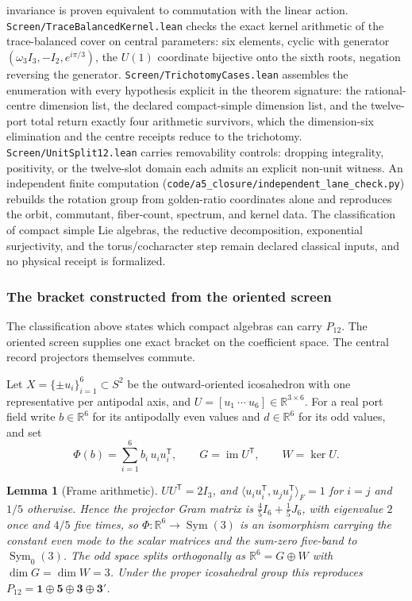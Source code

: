 \documentclass[11pt]{article}
\newtheorem{lemma}[theorem]{Lemma}
\begin{document}
invariance is proven equivalent to commutation with the linear action.
\texttt{Screen/\allowbreak TraceBalancedKernel.lean} checks the exact kernel
arithmetic of the trace-balanced cover on central parameters: six elements,
cyclic with generator \((\omega_3I_3,-I_2,e^{i\pi/3})\), the \(U(1)\)
coordinate bijective onto the sixth roots, negation reversing the generator.
\texttt{Screen/\allowbreak TrichotomyCases.lean} assembles the enumeration
with every hypothesis explicit in the theorem signature: the rational-centre
dimension list, the declared compact-simple dimension list, and the
twelve-port total return exactly four arithmetic survivors, which the
dimension-six elimination and the centre receipts reduce to the trichotomy.
\texttt{Screen/\allowbreak UnitSplit12.lean} carries removability controls:
dropping integrality, positivity, or the twelve-slot domain each admits an
explicit non-unit witness. An independent finite computation
(\texttt{code/a5\_closure/independent\_lane\_check.py}) rebuilds the rotation
group from golden-ratio coordinates alone and reproduces the orbit,
commutant, fiber-count, spectrum, and kernel data. The classification of
compact simple Lie algebras, the reductive decomposition, exponential
surjectivity, and the torus/cocharacter step remain declared classical
inputs, and no physical receipt is formalized.

\subsubsection*{The bracket constructed from the oriented screen}

The classification above states which compact algebras can carry \(P_{12}\).
The oriented screen supplies one exact bracket on the coefficient space. The
central record projectors themselves commute.

Let \(X=\{\pm u_i\}_{i=1}^{6}\subset S^2\) be the outward-oriented icosahedron
with one representative per antipodal axis, and \(U=[u_1\ \cdots\ u_6]\in
\mathbb R^{3\times6}\). For a real port field write \(b\in\mathbb R^6\) for its
antipodally even values and \(d\in\mathbb R^6\) for its odd values, and set
\[
  \Phi(b)=\sum_{i=1}^{6}b_i\,u_iu_i^{\mathsf T},
  \qquad
  G=\operatorname{im}U^{\mathsf T},
  \qquad
  W=\ker U .
\]

\begin{lemma}[Frame arithmetic]
\(UU^{\mathsf T}=2I_3\), and
\(\langle u_iu_i^{\mathsf T},u_ju_j^{\mathsf T}\rangle_F=1\) for \(i=j\) and
\(1/5\) otherwise. Hence the projector Gram matrix is
\(\tfrac45I_6+\tfrac15J_6\), with eigenvalue \(2\) once and \(4/5\) five times,
so \(\Phi:\mathbb R^6\to\operatorname{Sym}(3)\) is an isomorphism carrying the
constant even mode to the scalar matrices and the sum-zero five-band to
\(\operatorname{Sym}_0(3)\). The odd space splits orthogonally as
\(\mathbb R^6=G\oplus W\) with \(\dim G=\dim W=3\). Under the proper icosahedral
group this reproduces \(P_{12}=\mathbf1\oplus\mathbf5\oplus\mathbf3\oplus\mathbf3'\).
\end{lemma}
\end{document}
